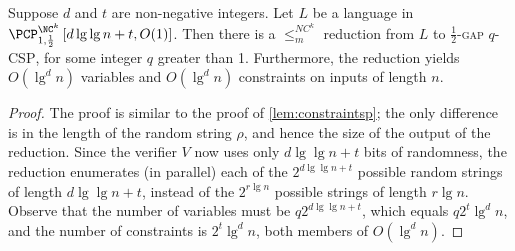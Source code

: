 \documentclass[]{article}
\newcommand{\PCPcs}[5]{\PCP^{#1}_{#2, #3}\left[#4, #5\right]}
\begin{document}
\begin{lemma}\label{lem:constraintsnc}
  Suppose $d$ and $t$ are non-negative integers.
  Let $L$ be a language in $\PCPcs{\NC^k}{1}{\frac{1}{2}}{d \lg \lg n + t}{O(1)}$.
  Then there is a $\leq_m^{NC^k}$ reduction from $L$ to \textsc{$\frac{1}{2}$-gap $q$-CSP}, for some integer $q$ greater than 1.
  Furthermore, the reduction yields $O(\lg^d n)$ variables and $O(\lg^d n)$ constraints on inputs of length $n$.
\end{lemma}
\begin{proof}
  The proof is similar to the proof of \autoref{lem:constraintsp}; the only difference is in the length of the random string $\rho$, and hence the size of the output of the reduction.
  Since the verifier $V$ now uses only $d \lg \lg n + t$ bits of randomness, the reduction enumerates (in parallel) each of the $2^{d \lg \lg n + t}$ possible random strings of length $d \lg \lg n + t$, instead of the $2^{r \lg n}$ possible strings of length $r \lg n$.
  Observe that the number of variables must be $q 2^{d \lg \lg n + t}$, which equals $q 2^t \lg^d n$, and the number of constraints is $2^t \lg^d n$, both members of $O(\lg^d n)$.
\end{proof}
\end{document}
